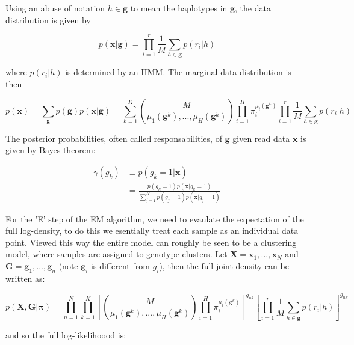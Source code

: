 \documentclass{article}
\begin{document}
Using an abuse of notation $h \in \boldsymbol{g}$ to mean the haplotypes in $\boldsymbol{g}$, the data distribution is given by

\begin{equation} 
    p(\boldsymbol{x} | \boldsymbol{g}) = \prod_{i = 1}^{r} \frac{1}{M} \sum_{h \in \boldsymbol{g}} p(r_i | h)
\end{equation}

where $p(r_i | h)$ is determined by an HMM. The marginal data distribution is then

\begin{equation} 
    p(\boldsymbol{x}) = \sum_{\boldsymbol{g}} p(\boldsymbol{g}) p(\boldsymbol{x} | \boldsymbol{g}) = \sum_{k = 1}^{K}  \binom{M}{\mu_1(\boldsymbol{g}^k),...,\mu_H(\boldsymbol{g}^k)} \prod_{i = 1}^H \pi_i^{\mu_i(\boldsymbol{g}^k)} \prod_{i = 1}^{r} \frac{1}{M} \sum_{h \in \boldsymbol{g}} p(r_i | h)
\end{equation}

The posterior probabilities, often called responsabilities, of $\boldsymbol{g}$ given read data $\boldsymbol{x}$ is given by Bayes theorem:

\begin{align} 
    \gamma(g_k) &\equiv p(g_k = 1 | \boldsymbol{x}) \\
    &= \frac{p(g_k = 1) p(\boldsymbol{x} | g_k = 1)}{\sum_{j = 1}^{K} p(g_j = 1) p(\boldsymbol{x} | g_j = 1)}
\end{align}

For the 'E' step of the EM algorithm, we need to evaulate the expectation of the full log-density, to do this we esentially treat each sample as an individual data point. Viewed this way the entire model can roughly be seen to be a clustering model, where samples are assigned to genotype clusters. Let $\boldsymbol{X} = {\boldsymbol{x}_1, ..., \boldsymbol{x}_N}$ and $\boldsymbol{G} = {\boldsymbol{g}_1, ..., \boldsymbol{g}_n}$ (note $\boldsymbol{g}_i$ is different from $g_i$), then the full joint density can be written as:

\begin{equation} 
    p(\boldsymbol{X}, \boldsymbol{G} | \boldsymbol{\pi}) = \prod_{n = 1}^N \prod_{k = 1}^K \left[ \binom{M}{\mu_1(\boldsymbol{g}^k),...,\mu_H(\boldsymbol{g}^k)} \prod_{i = 1}^H \pi_i^{\mu_i(\boldsymbol{g}^k)} \right]^{g_{nk}} \left[ \prod_{i = 1}^{r} \frac{1}{M} \sum_{h \in \boldsymbol{g}} p(r_i | h) \right]^{g_{nk}}
\end{equation}

and so the full log-likelihoood is:
\end{document}

